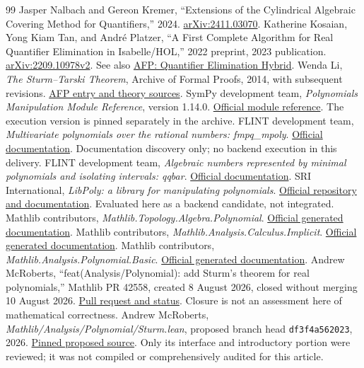 \begin{thebibliography}{99}
 Jasper Nalbach and Gereon Kremer, ``Extensions of the Cylindrical Algebraic Covering Method for Quantifiers,'' 2024. \href{https://arxiv.org/abs/2411.03070}{arXiv:2411.03070}.
 Katherine Kosaian, Yong Kiam Tan, and Andr\'e Platzer, ``A First Complete Algorithm for Real Quantifier Elimination in Isabelle/HOL,'' 2022 preprint, 2023 publication. \href{https://arxiv.org/html/2209.10978v2}{arXiv:2209.10978v2}. See also \href{https://isa-afp.org/entries/Quantifier_Elimination_Hybrid.html}{AFP: Quantifier Elimination Hybrid}.
 Wenda Li, \emph{The Sturm--Tarski Theorem}, Archive of Formal Proofs, 2014, with subsequent revisions. \href{https://isa-afp.org/entries/Sturm_Tarski.html}{AFP entry and theory sources}.
 SymPy development team, \emph{Polynomials Manipulation Module Reference}, version 1.14.0. \href{https://docs.sympy.org/latest/modules/polys/reference.html}{Official module reference}. The execution version is pinned separately in the archive.
 FLINT development team, \emph{Multivariate polynomials over the rational numbers: fmpq\_mpoly}. \href{https://flintlib.org/doc/fmpq_mpoly.html}{Official documentation}. Documentation discovery only; no backend execution in this delivery.
 FLINT development team, \emph{Algebraic numbers represented by minimal polynomials and isolating intervals: qqbar}. \href{https://flintlib.org/doc/qqbar.html}{Official documentation}.
 SRI International, \emph{LibPoly: a library for manipulating polynomials}. \href{https://github.com/SRI-CSL/libpoly}{Official repository and documentation}. Evaluated here as a backend candidate, not integrated.
 Mathlib contributors, \emph{Mathlib.Topology.Algebra.Polynomial}. \href{https://leanprover-community.github.io/mathlib4_docs/Mathlib/Topology/Algebra/Polynomial.html}{Official generated documentation}.
 Mathlib contributors, \emph{Mathlib.Analysis.Calculus.Implicit}. \href{https://leanprover-community.github.io/mathlib4_docs/Mathlib/Analysis/Calculus/Implicit.html}{Official generated documentation}.
 Mathlib contributors, \emph{Mathlib.Analysis.Polynomial.Basic}. \href{https://leanprover-community.github.io/mathlib4_docs/Mathlib/Analysis/Polynomial/Basic.html}{Official generated documentation}.
 Andrew McRoberts, ``feat(Analysis/Polynomial): add Sturm's theorem for real polynomials,'' Mathlib PR 42558, created 8 August 2026, closed without merging 10 August 2026. \href{https://github.com/leanprover-community/mathlib4/pull/42558}{Pull request and status}. Closure is not an assessment here of mathematical correctness.
 Andrew McRoberts, \emph{Mathlib/Analysis/Polynomial/Sturm.lean}, proposed branch head \texttt{df3f4a562023}, 2026. \href{https://github.com/AMcRoberts/mathlib4/blob/df3f4a5620232d6164fb8cbb0177876f5a29de18/Mathlib/Analysis/Polynomial/Sturm.lean}{Pinned proposed source}. Only its interface and introductory portion were reviewed; it was not compiled or comprehensively audited for this article.
\end{thebibliography}
